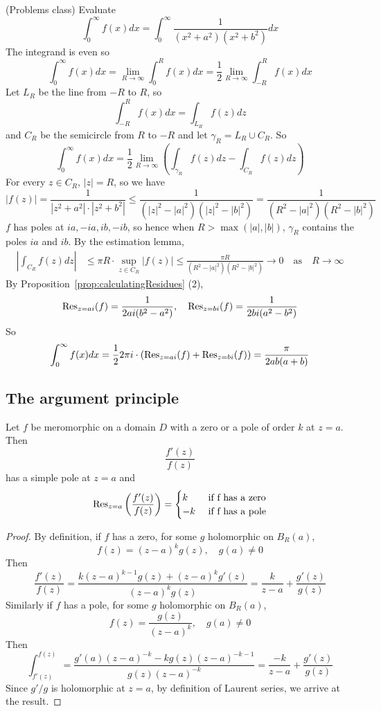 \begin{example}
	(Problems class) Evaluate
	\[
		\int_{0}^{\infty} f(x) dx = \int_{0}^{\infty} \frac{1}{(x^2 + a^2)(x^2 + b^2)} dx
	\]
	The integrand is even so
	\[
		\int_{0}^{\infty} f(x) dx = \lim_{R \to \infty} \int_{0}^{R} f(x) dx = \frac{1}{2} \lim_{R \to \infty} \int_{-R}^R f(x) dx
	\]
	Let $L_R$ be the line from $-R$ to $R$, so
	\[
		\int_{-R}^{R} f(x) dx = \int_{L_R} f(z) dz
	\]
	and $C_R$ be the semicircle from $R$ to $-R$ and let $\gamma_R = L_R \cup C_R$. So
	\[
		\int_{0}^{\infty} f(x) dx = \frac{1}{2} \lim_{R \to \infty} \left( \int_{\gamma_R} f(z) dz - \int_{C_R} f(z) dz \right)
	\]
	For every $z \in C_R$, $|z| = R$, so we have
	\[
		|f(z)| = \frac{1}{|z^2 + a^2| \cdot |z^2 + b^2|} \le \frac{1}{(|z|^2 - |a|^2)(|z|^2 - |b|^2)} = \frac{1}{(R^2 - |a|^2)(R^2 - |b|^2)}
	\]
	$f$ has poles at $ia, -ia, ib, -ib$, so hence when $R > \max(|a|, |b|)$, $\gamma_R$ contains the poles $ia$ and $ib$. By the estimation lemma,
	\[
		\begin{aligned}
			\left| \int_{C_R} f(z) dz \right| & \le \pi R \cdot \sup_{z \in C_R} |f(z)| \le \frac{\pi R}{(R^2 - |a|^2)(R^2 - |b|^2)} \to 0 \quad \text{as} \quad R \to \infty
		\end{aligned}
	\]
	By Proposition~\ref{prop:calculatingResidues} (2),
	\[
		\text{Res}_{z = ai} (f) = \frac{1}{2ai (b^2 - a^2)}, \quad \text{Res}_{z = bi} (f) = \frac{1}{2bi (a^2 - b^2)}
	\]
	So
	\[
		\int_{0}^{\infty} f(x) dx = \frac{1}{2} 2 \pi i \cdot (\text{Res}_{z = ai} (f) + \text{Res}_{z = bi} (f)) = \frac{\pi}{2ab(a + b)}
	\]
\end{example}

\subsection{The argument principle}

\begin{lemma}
	Let $f$ be meromorphic on a domain $D$ with a zero or a pole of order $k$ at $z = a$. Then
	\[
		\frac{f'(z)}{f(z)}
	\]
	has a simple pole at $z = a$ and
	\[
		\text{Res}_{z = a} \left( \frac{f'(z)}{f(z)} \right) = \begin{cases}
			k & \text{ if f has a zero} \\
			-k & \text{ if f has a pole}
		\end{cases}
	\]
\end{lemma}

\begin{proof}
	By definition, if $f$ has a zero, for some $g$ holomorphic on $B_R(a)$,
	\[
		f(z) = {(z - a)}^k g(z), \quad g(a) \ne 0
	\]
	Then
	\[
		\frac{f'(z)}{f(z)} = \frac{k {(z - a)}^{k - 1} g(z) + {(z - a)}^k g'(z)}{{(z - a)}^k g(z)} = \frac{k}{z - a} + \frac{g'(z)}{g(z)}
	\]
	Similarly if $f$ has a pole, for some $g$ holomorphic on $B_R(a)$,
	\[
		f(z) = \frac{g(z)}{{(z - a)}^k}, \quad g(a) \ne 0
	\]
	Then
	\[
		\int_{f'(z)}^{f(z)} = \frac{g'(a) {(z - a)}^{-k} - k g(z) {(z - a)}^{-k - 1}}{g(z) {(z - a)}^{-k}} = \frac{-k}{z - a} + \frac{g'(z)}{g(z)}
	\]
	Since $g' / g$ is holomorphic at $z = a$, by definition of Laurent series, we arrive at the result.
\end{proof}

